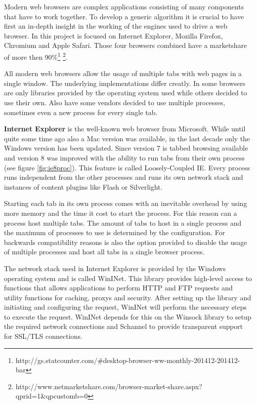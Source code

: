 

Modern web browsers are complex applications consisting of many components that have to work together. To develop a generic algorithm it is crucial to have first an in-depth insight in the working of the engines used to drive a web browser. In this project is focused on Internet Explorer, Mozilla Firefox, Chromium and Apple Safari. Those four browsers combined have a marketshare of more then 90\%\footnote{http://gs.statcounter.com/\#desktop-browser-ww-monthly-201412-201412-bar} \footnote{http://www.netmarketshare.com/browser-market-share.aspx?qprid=1\&qpcustomb=0}.

All modern web browsers allow the usage of multiple tabs with web pages in a single window. The underlying implementations differ creatly. In some browsers are only libraries provided by the operating system used while others decided to use their own. Also have some vendors decided to use multiple processes, sometimes even a new process for every single tab.

\textbf{Internet Explorer} is the well-known web browser from Microsoft. While until quite some time ago also a Mac version was available, in the last decade only the Windows version has been updated. Since version 7 is tabbed browsing available and version 8 was improved with the ability to run tabs from their own process (see figure \ref{fig:ie8proc}). This feature is called Loosely-Coupled IE\cite{IE8LCIE}. Every process runs independent from the other processes and runs its own network stack and instances of content plugins like Flash or Silverlight.

Starting each tab in its own process comes with an inevitable overhead by using more memory and the time it cost to start the process. For this reason can a process host multiple tabs. The amount of tabs to host in a single process and the maximum of processes to use is determined by the configuration. For backwards compatibility reasons is also the option provided to disable the usage of multiple processes and host all tabs in a single browser process.

The network stack used in Internet Explorer is provided by the Windows operating system and is called WinINet. This library provides high-level access to functions that allows applications to perform HTTP and FTP requests and utility functions for caching, proxys and security. After setting up the library and initiating and configuring the request, WinINet will perform the necessary steps to execute the request. WinINet depends for this on the Winsock library to setup the required network connections and Schannel to provide transparent support for SSL/TLS connections.

